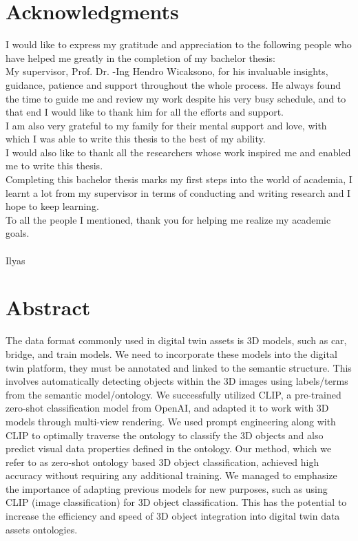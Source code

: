 \documentclass[a4paper,11pt,oneside]{article}
\begin{document}
  \section*{Acknowledgments}
  I would like to express my gratitude and appreciation to the following people who have helped me greatly in the completion of my bachelor thesis:
  \\
  My supervisor, Prof. Dr. -Ing Hendro Wicaksono, for his invaluable insights, guidance, patience and support throughout the whole process. He always found the time to guide me and review my work despite his very busy schedule, and to that end I would like to thank him for all the efforts and support.
  \\
  I am also very grateful to my family for their mental support and love, with which I was able to write this thesis to the best of my ability.
  \\
  I would also like to thank all the researchers whose work inspired me and enabled me to write this thesis.
  \\
  Completing this bachelor thesis marks my first steps into the world of academia, I learnt a lot from my supervisor in terms of conducting and writing research and I hope to keep learning.
  \\
  To all the people I mentioned, thank you for helping me realize my academic goals.
  \\
  \\
  Ilyas
  
  
  \newpage

  \section*{Abstract}
  
  The data format commonly used in digital twin assets is 3D models, such as car, bridge, and train models. We need to incorporate these models into the digital twin platform, they must be annotated and linked to the semantic structure. This involves automatically detecting objects within the 3D images using labels/terms from the semantic model/ontology. We successfully utilized CLIP, a pre-trained zero-shot classification model from OpenAI, and adapted it to work with 3D models through multi-view rendering. We used prompt engineering along with CLIP to optimally traverse the ontology to classify the 3D objects and also predict visual data properties defined in the ontology. Our method, which we refer to as zero-shot ontology based 3D object classification, achieved high accuracy without requiring any additional training. We managed to emphasize the importance of adapting previous models for new purposes, such as using CLIP (image classification) for 3D object classification. This has the potential to increase the efficiency and speed of 3D object integration into digital twin data assets ontologies.
\end{document}
